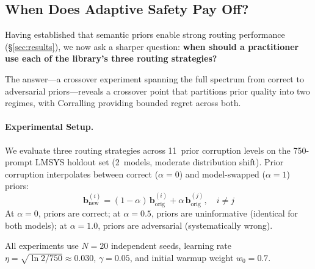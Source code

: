 
\subsection{When Does Adaptive Safety Pay Off?}
\label{sec:metalearning_cost}

Having established that semantic priors enable strong routing
performance (\S\ref{sec:results}), we now ask a sharper question:
\textbf{when should a practitioner use each of the library's three
routing strategies?}

The answer---a crossover experiment spanning the full spectrum from
correct to adversarial priors---reveals a crossover point that
partitions prior quality into two regimes, with Corralling providing
bounded regret across both.

\paragraph{Experimental Setup.}
We evaluate three routing strategies across 11~prior corruption levels
on the 750-prompt LMSYS holdout set (2~models, moderate distribution
shift).  Prior corruption interpolates between correct ($\alpha{=}0$)
and model-swapped ($\alpha{=}1$) priors:
%
\begin{equation}
    \mathbf{b}_{\text{new}}^{(i)} = (1{-}\alpha)\,\mathbf{b}_{\text{orig}}^{(i)}
    + \alpha\,\mathbf{b}_{\text{orig}}^{(j)}, \quad i \neq j
\end{equation}
%
At $\alpha{=}0$, priors are correct; at $\alpha{=}0.5$, priors are
uninformative (identical for both models); at $\alpha{=}1.0$, priors
are adversarial (systematically wrong).

All experiments use $N{=}20$ independent seeds, learning rate
$\eta{=}\sqrt{\ln 2/750}{\approx}0.030$, $\gamma{=}0.05$, and
initial warmup weight $w_0{=}0.7$.


